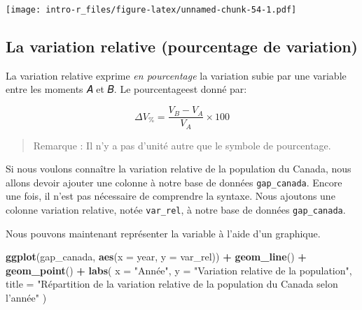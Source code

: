 \documentclass[]{book}
\newenvironment{Shaded}{\begin{snugshade}}{\end{snugshade}}
\newcommand{\KeywordTok}[1]{\textcolor[rgb]{0.13,0.29,0.53}{\textbf{#1}}}
\newcommand{\DataTypeTok}[1]{\textcolor[rgb]{0.13,0.29,0.53}{#1}}
\newcommand{\DecValTok}[1]{\textcolor[rgb]{0.00,0.00,0.81}{#1}}
\newcommand{\StringTok}[1]{\textcolor[rgb]{0.31,0.60,0.02}{#1}}
\newcommand{\OperatorTok}[1]{\textcolor[rgb]{0.81,0.36,0.00}{\textbf{#1}}}
\newcommand{\NormalTok}[1]{#1}
\begin{document}
\texttt{[image: intro-r\_files/figure-latex/unnamed-chunk-54-1.pdf]}

\subsection{La variation relative (pourcentage de
variation)}\label{la-variation-relative-pourcentage-de-variation}

La variation relative exprime \emph{en pourcentage} la variation subie
par une variable entre les moments 𝐴 et 𝐵. Le pourcentageest donné par:

\begin{equation}
\Delta V_{\%} = \dfrac{V_B - V_A}{V_A}\times 100
\end{equation}

\begin{quote}
Remarque : Il n'y a pas d'unité autre que le symbole de pourcentage.
\end{quote}

Si nous voulons connaître la variation relative de la population du
Canada, nous allons devoir ajouter une colonne à notre base de données
\texttt{gap\_canada}. Encore une fois, il n'est pas nécessaire de
comprendre la syntaxe. Nous ajoutons une colonne variation relative,
notée \texttt{var\_rel}, à notre base de données \texttt{gap\_canada}.

\begin{Shaded}
\end{Shaded}

Nous pouvons maintenant représenter la variable à l'aide d'un graphique.

\begin{Shaded}
\begin{Highlighting}[]
\KeywordTok{ggplot}\NormalTok{(gap_canada, }\KeywordTok{aes}\NormalTok{(}\DataTypeTok{x =}\NormalTok{ year, }\DataTypeTok{y =}\NormalTok{ var_rel)) }\OperatorTok{+}
\StringTok{  }\KeywordTok{geom_line}\NormalTok{() }\OperatorTok{+}
\StringTok{  }\KeywordTok{geom_point}\NormalTok{() }\OperatorTok{+}
\StringTok{  }\KeywordTok{labs}\NormalTok{(}
    \DataTypeTok{x =} \StringTok{"Année"}\NormalTok{,}
    \DataTypeTok{y =} \StringTok{"Variation relative de la population"}\NormalTok{,}
    \DataTypeTok{title =} \StringTok{"Répartition de la variation relative de la population du Canada selon l'année"}
\NormalTok{  )}
\end{Highlighting}
\end{Shaded}
\end{document}
